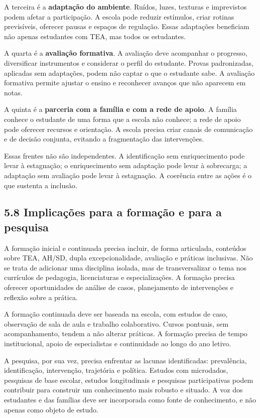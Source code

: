 A terceira é a \textbf{adaptação do ambiente}. Ruídos, luzes, texturas e
imprevistos podem afetar a participação. A escola pode reduzir
estímulos, criar rotinas previsíveis, oferecer pausas e espaços de
regulação. Essas adaptações beneficiam não apenas estudantes com TEA,
mas todos os estudantes.

A quarta é a \textbf{avaliação formativa}. A avaliação deve acompanhar o
progresso, diversificar instrumentos e considerar o perfil do estudante.
Provas padronizadas, aplicadas sem adaptações, podem não captar o que o
estudante sabe. A avaliação formativa permite ajustar o ensino e
reconhecer avanços que não aparecem em notas.

A quinta é a \textbf{parceria com a família e com a rede de apoio}. A
família conhece o estudante de uma forma que a escola não conhece; a
rede de apoio pode oferecer recursos e orientação. A escola precisa
criar canais de comunicação e de decisão conjunta, evitando a
fragmentação das intervenções.

Essas frentes não são independentes. A identificação sem enriquecimento
pode levar à estagnação; o enriquecimento sem adaptação pode levar à
sobrecarga; a adaptação sem avaliação pode levar à estagnação. A
coerência entre as ações é o que sustenta a inclusão.

\subsection{5.8 Implicações para a formação e para a
pesquisa}\label{implicauxe7uxf5es-para-a-formauxe7uxe3o-e-para-a-pesquisa}

A formação inicial e continuada precisa incluir, de forma articulada,
conteúdos sobre TEA, AH/SD, dupla excepcionalidade, avaliação e práticas
inclusivas. Não se trata de adicionar uma disciplina isolada, mas de
transversalizar o tema nos currículos de pedagogia, licenciaturas e
especializações. A formação precisa oferecer oportunidades de análise de
casos, planejamento de intervenções e reflexão sobre a prática.

A formação continuada deve ser baseada na escola, com estudos de caso,
observação de sala de aula e trabalho colaborativo. Cursos pontuais, sem
acompanhamento, tendem a não alterar práticas. A formação precisa de
tempo institucional, apoio de especialistas e continuidade ao longo do
ano letivo.

A pesquisa, por sua vez, precisa enfrentar as lacunas identificadas:
prevalência, identificação, intervenção, trajetória e política. Estudos
com microdados, pesquisas de base escolar, estudos longitudinais e
pesquisas participativas podem contribuir para construir um conhecimento
mais robusto e situado. A voz dos estudantes e das famílias deve ser
incorporada como fonte de conhecimento, e não apenas como objeto de
estudo.

